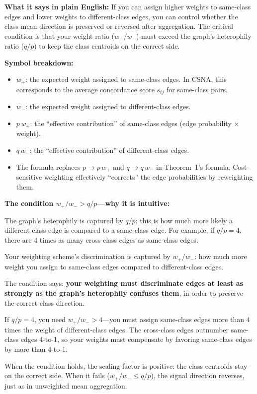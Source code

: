 \documentclass[11pt,a4paper]{article}
\theoremstyle{definition}
\theoremstyle{plain}
\begin{document}
\textbf{What it says in plain English:}
If you can assign higher weights to same-class edges and lower weights to
different-class edges, you can control whether the class-mean direction is
preserved or reversed after aggregation.
The critical condition is that your weight ratio ($w_+/w_-$) must exceed the
graph's heterophily ratio ($q/p$) to keep the class centroids on the correct side.

\textbf{Symbol breakdown:}
\begin{itemize}
  \item $w_+$: the expected weight assigned to same-class edges. In CSNA,
    this corresponds to the average concordance score $s_{ij}$ for same-class pairs.
  \item $w_-$: the expected weight assigned to different-class edges.
  \item $p\, w_+$: the ``effective contribution'' of same-class edges
    (edge probability $\times$ weight).
  \item $q\, w_-$: the ``effective contribution'' of different-class edges.
  \item The formula replaces $p \to p\, w_+$ and $q \to q\, w_-$ in Theorem~1's
    formula. Cost-sensitive weighting effectively ``corrects'' the edge probabilities
    by reweighting them.
\end{itemize}

\textbf{The condition $w_+/w_- > q/p$---why it is intuitive:}

\begin{keyidea}[title=The Key Condition: $w_+/w_- > q/p$]
The graph's heterophily is captured by $q/p$: this is how much more likely a
different-class edge is compared to a same-class edge.
For example, if $q/p = 4$, there are 4 times as many cross-class edges as
same-class edges.

Your weighting scheme's discrimination is captured by $w_+/w_-$: how much more
weight you assign to same-class edges compared to different-class edges.

The condition says: \textbf{your weighting must discriminate edges at least as strongly as
the graph's heterophily confuses them}, in order to preserve the correct class direction.

If $q/p = 4$, you need $w_+/w_- > 4$---you must assign same-class edges more
than 4 times the weight of different-class edges.
The cross-class edges outnumber same-class edges 4-to-1, so your weights must
compensate by favoring same-class edges by more than 4-to-1.

When the condition holds, the scaling factor is positive: the class centroids stay
on the correct side.
When it fails ($w_+/w_- \leq q/p$), the signal direction reverses, just as
in unweighted mean aggregation.
\end{keyidea}
\end{document}
